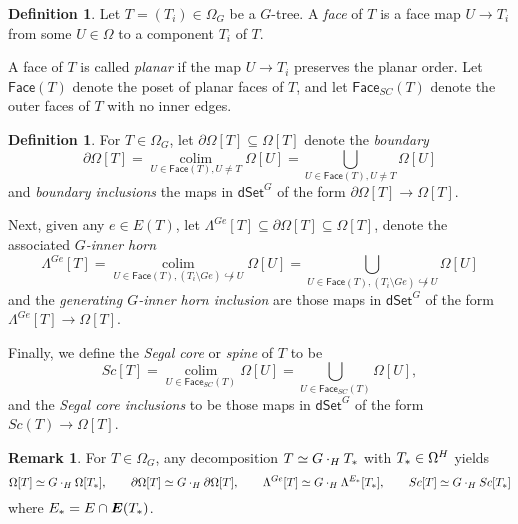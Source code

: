 \documentclass[a4paper,10pt
,draft
]{article}%
\numberwithin{equation}{section}
\numberwithin{figure}{section}
\theoremstyle{definition} %
\newtheorem{definition}[equation]{Definition}%
\newtheorem{remark}[equation]{Remark}%
\newcommand{\into}{\hookrightarrow}%
\newcommand{\dSet}{\mathsf{dSet}}
\DeclareMathOperator{\colim}{colim}%
\newcommand{\1}{\ensuremath{\mathbbm 1}}%
\begin{document}
\begin{definition}
      Let $T = (T_i) \in \Omega_G$ be a $G$-tree.
      A \textit{face} of $T$ is a face map $U \to T_i$ from some $U \in \Omega$ to a component $T_i$ of $T$.

      A face of $T$ is called \textit{planar} if the map $U \to T_i$ preserves the planar order.
      Let $\mathsf{Face}(T)$ denote the poset of planar faces of $T$,
      and let $\mathsf{Face}_{SC}(T)$ denote the outer faces of $T$ with no inner edges.
\end{definition}

\begin{definition}
      \label{DSETPRESHEAF_DEF}
      For $T \in \Omega_G$, let $\partial \Omega[T] \subseteq \Omega[T]$ denote the \textit{boundary}
      \begin{equation}
            \partial \Omega[T]  = \mathop{\colim}\limits_{U \in \mathsf{Face}(T), U \neq T} \Omega[U] = \bigcup_{U \in \mathsf{Face}(T), U \neq T} \Omega[U]
      \end{equation}
      and \textit{boundary inclusions} the maps in $\dSet^G$ of the form
      $\partial \Omega[T] \to \Omega[T]$.

      Next, given any $e \in E(T)$, let
      $\Lambda^{Ge}[T] \subseteq \partial \Omega[T] \subseteq \Omega[T]$,
      denote the associated \textit{$G$-inner horn}
      \begin{equation}
            \label{GINNERHORN_EQ}
            \Lambda^{Ge}[T] = \mathop{\colim}\limits_{U \in \mathsf{Face}(T), (T_i \setminus Ge) \not\into U} \Omega[U]
            = \bigcup_{U \in \mathsf{Face}(T), (T_i \setminus Ge) \not\into U} \Omega[U]
      \end{equation}
      and the \textit{generating $G$-inner horn inclusion} are those maps in $\dSet^G$ of the form
      $\Lambda^{Ge}[T] \to \Omega[T]$.

      Finally, we define the \textit{Segal core} or \textit{spine} of $T$ to be
      \begin{equation}
            \label{eq:SC}
            Sc[T] = \mathop{\colim}\limits_{U \in \mathsf{Face}_{SC}(T)} \Omega[U] = \bigcup_{U \in \mathsf{Face}_{SC}(T)} \Omega[U],
      \end{equation}
      and the \textit{Segal core inclusions} to be those maps in $\dSet^G$ of the form
      $Sc(T) \to \Omega[T]$.
\end{definition}


\begin{remark}
      For $T \in \Omega_G$, any decomposition $T \simeq G \cdot_H T_{\**}$ with $T_{\**} \in \Omega^H$ yields
      \[
            \Omega[T] \simeq G \cdot_H \Omega[T_{\**}],
            \qquad
            \partial\Omega[T] \simeq G \cdot_H \partial \Omega[T],
            \qquad
            \Lambda^{Ge}[T] \simeq G \cdot_H \Lambda^{E_{\**}}[T_{\**}],
            \qquad
            Sc[T] \simeq G \cdot_H Sc[T_{\**}]
      \]
      where $E_{\**} = E \cap \boldsymbol{E}(T_{\**})$.
\end{remark}
\end{document}

